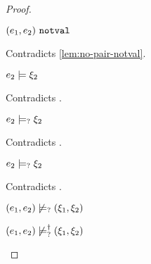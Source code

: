\begin{proof}
\begin{byCases}
\begin{byCases}
\begin{byCases}
\begin{byCases}
\begin{pfsteps*}
                \item $(e_1 , e_2) ~\mathtt{notval}$ 
                \end{pfsteps*}
                Contradicts \autoref{lem:no-pair-notval}.
            \item[\text{(\ref{rule:CMSPair1})}]
                \begin{pfsteps*}
                \item $e_2 \models \xi_2$ 
                \end{pfsteps*}
                Contradicts .
            \item[\text{(\ref{rule:CMSPair2})}]
                \begin{pfsteps*}
                \item $e_2 \models_{?} \xi_2$ 
                \end{pfsteps*}
                Contradicts .
            \item[\text{(\ref{rule:CMSPair3})}]
                \begin{pfsteps*}
                \item $e_2 \models_{?} \xi_2$ 
                \end{pfsteps*}
                Contradicts .
            \end{byCases}
            \begin{pfsteps*}
            \item $(e_1 , e_2) \not\models_{?} (\xi_1 , \xi_2)$  
            \item $(e_1 , e_2) \not\models_{?}^{\dag} (\xi_1 , \xi_2)$ 
            \end{pfsteps*}
            

\end{byCases}
\end{byCases}
\end{byCases}
\end{proof}
